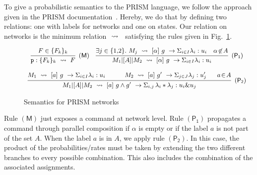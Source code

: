  To give a probabilistic semantics to the PRISM
language, we follow the approach given in the PRISM
documentation~\cite{PRISMdoc}.  Hereby, we do that by defining two
relations: one with labels for networks and one on states. Our
relation on networks is the minimum relation $\ \stackrel{}{\rightsquigarrow}\ {}$
satisfying the rules given in Fig.~\ref{fig:semantics}.
% 
\begin{figure}[h]
  \begin{displaymath}\small
    \begin{array}{ccc}
      \infer[\mathsf{(M)}]
      { {\role{p}:\{F_k\}_k} \prismred{} F
      }
      {
      F\in\{F_k\}_k
      }
      \quad
      \infer[\mathsf{(P_1)}]
      {M_1\ppp A M_2\prismred{}\command {\alpha}g\lambda u
      }
      {
      \exists j\in\{1,\!2\}.\ 
      M_j\prismred{} \command {\alpha}g\lambda u
      & \alpha\!\not\in\! A
        }
      \\\\
      \infer[\mathsf{(P_2)}]
      {M_1\ppp A M_2\prismred{}
      \commandBase a{g\land g'}
      {\Sigma_{i,j}\,\lambda_i*\lambda_j}: {u_i\& u_j} 
      }
      {
      M_1\prismred{}\command {a}g\lambda u
      \quad&\quad 
        M_2\prismred{}\commandBase {a} {g'} \Sigma_{j\in J}\lambda_j: u'_j
      \ &\
             a\!\in\! A}
    \end{array}
  \end{displaymath}
  \caption{Semantics for PRISM networks} 
  \label{fig:semantics}
\end{figure}
Rule $\mathsf{(M)}$ just exposes a command at network level. Rule
$\mathsf{(P_1)}$ propagates a command through parallel composition if
$\alpha$ is empty or if the label $a$ is not part of the set $A$. When
the label $a$ is in $A$, we apply rule $\mathsf{(P_2)}$. In this case,
the product of the probabilities/rates must be taken by extending the
two different branches to every possible combination. This also
includes the combination of the associated assignments.

